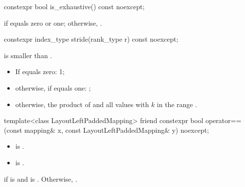 %
\begin{itemdecl}
constexpr bool is_exhaustive() const noexcept;
\end{itemdecl}

\begin{itemdescr}
\pnum
\returns
{} if  equals zero or one;
otherwise, .
\end{itemdescr}

%
\begin{itemdecl}
constexpr index_type stride(rank_type r) const noexcept;
\end{itemdecl}

\begin{itemdescr}
\pnum
\expects
{} is smaller than .

\pnum
\returns
\begin{itemize}
\item
If  equals zero: 1;
\item
otherwise, if  equals one: ;
\item
otherwise, the product of  and
all values  with $k$ in the range .
\end{itemize}
\end{itemdescr}

%
\begin{itemdecl}
template<class LayoutLeftPaddedMapping>
  friend constexpr bool operator==(const mapping& x, const LayoutLeftPaddedMapping& y) noexcept;
\end{itemdecl}

\begin{itemdescr}
\pnum
\constraints
\begin{itemize}
\item
{}
is .
\item
{} is .
\end{itemize}

\pnum
\returns
{} if  is  and
 is .
Otherwise, .
\end{itemdescr}

